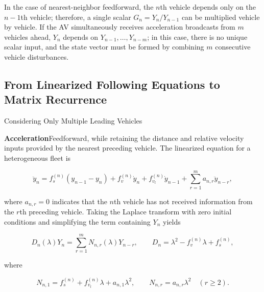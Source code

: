 \documentclass[11pt,a4paper,openany]{book}
\numberwithin{equation}{chapter}
\numberwithin{figure}{chapter}
\numberwithin{table}{chapter}
\begin{document}
\label{sec:heter-multileader}




In the case of nearest-neighbor feedforward, the $n$th vehicle depends only on the $n-1$th vehicle; therefore, a single scalar $G_n=Y_n/Y_{n-1}$ can be multiplied vehicle by vehicle. If the AV simultaneously receives acceleration broadcasts from $m$ vehicles ahead, $Y_n$ depends on $Y_{n-1},\ldots,Y_{n-m}$; in this case, there is no unique scalar input, and the state vector must be formed by combining $m$ consecutive vehicle disturbances.










\subsection{From Linearized Following Equations to Matrix Recurrence}










Considering Only Multiple Leading Vehicles




\textbf{Acceleration}Feedforward, while retaining the distance and relative velocity inputs provided by the nearest preceding vehicle. The linearized equation for a heterogeneous fleet is

\begin{equation}
\ddot y_n
=f_s^{(n)}(y_{n-1}-y_n)+f_v^{(n)}\dot y_n
+f_{v_l}^{(n)}\dot y_{n-1}
+\sum_{r=1}^{m}a_{n,r}\ddot y_{n-r},
\label{eq:heter-multi-time}
\end{equation}

where $a_{n,r}=0$ indicates that the $n$th vehicle has not received information from the $r$th preceding vehicle. Taking the Laplace transform with zero initial conditions and simplifying the term containing $Y_n$ yields

\begin{equation}
D_n(\lambda)Y_n
=\sum_{r=1}^{m}N_{n,r}(\lambda)Y_{n-r},
\qquad
D_n=\lambda^2-f_v^{(n)}\lambda+f_s^{(n)},
\label{eq:heter-multi-laplace}
\end{equation}

where

\begin{equation}
N_{n,1}=f_s^{(n)}+f_{v_l}^{(n)}\lambda+a_{n,1}\lambda^2,
\qquad
N_{n,r}=a_{n,r}\lambda^2\quad(r\ge2).
\label{eq:heter-multi-numerators}
\end{equation}
\end{document}
